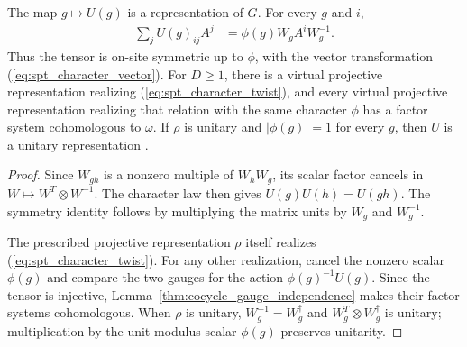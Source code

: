 \begin{lemma}%
    \label{thm:spt_fixed_point_class}
    \leanok
    The map $g\mapsto U(g)$ is a representation of $G$. For every $g$ and $i$,
    \begin{align}
        \sum_jU(g)_{ij}A^j
         & =\phi(g)W_gA^iW_g^{-1}.
        \label{eq:spt_character_twist}
    \end{align}
    Thus the tensor is on-site symmetric up to $\phi$, with the vector
    transformation (\ref{eq:spt_character_vector}). For $D\geq1$, there is
    a virtual projective representation realizing
    (\ref{eq:spt_character_twist}), and every virtual projective
    representation realizing that relation with the same character
    $\phi$ has a factor system cohomologous to $\omega$.
    If $\rho$ is unitary and $|\phi(g)|=1$ for every $g$, then $U$ is
    a unitary representation \cite[Section~III.A]{Cirac2021Matrix}.
\end{lemma}
\begin{proof}
    \leanok
    Since $W_{gh}$ is a nonzero multiple of $W_hW_g$, its scalar factor
    cancels in $W\mapsto W^{T}\otimes W^{-1}$. The character law then gives
    $U(g)U(h)=U(gh)$. The symmetry identity follows by multiplying the
    matrix units by $W_g$ and $W_g^{-1}$.

    The prescribed projective representation $\rho$ itself realizes
    (\ref{eq:spt_character_twist}). For any other realization, cancel
    the nonzero scalar $\phi(g)$ and compare the two gauges for the action
    $\phi(g)^{-1}U(g)$. Since the tensor is injective,
    Lemma~\ref{thm:cocycle_gauge_independence} makes their factor systems
    cohomologous. When $\rho$ is unitary, $W_g^{-1}=W_g^\dagger$ and
    $W_g^T\otimes W_g^\dagger$ is unitary; multiplication by the unit-modulus
    scalar $\phi(g)$ preserves unitarity.
\end{proof}

